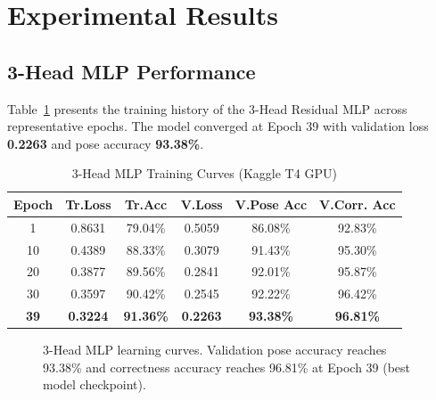 \documentclass[conference]{IEEEtran}
\begin{document}
\section{Experimental Results}
\label{sec:experiments}

\subsection{3-Head MLP Performance}

Table~\ref{tab:mlpresult} presents the training history of the 3-Head Residual MLP
across representative epochs. The model converged at Epoch 39 with validation loss
\textbf{0.2263} and pose accuracy \textbf{93.38\%}.

\begin{table}[ht]
\centering
\caption{3-Head MLP Training Curves (Kaggle T4 GPU)}
\label{tab:mlpresult}
\begin{tabular}{@{}c|cccc|c@{}}
\toprule
\textbf{Epoch} & \textbf{Tr.Loss} & \textbf{Tr.Acc} & \textbf{V.Loss} &
\textbf{V.Pose Acc} & \textbf{V.Corr. Acc} \\
\midrule
1  & 0.8631 & 79.04\% & 0.5059 & 86.08\% & 92.83\% \\
10 & 0.4389 & 88.33\% & 0.3079 & 91.43\% & 95.30\% \\
20 & 0.3877 & 89.56\% & 0.2841 & 92.01\% & 95.87\% \\
30 & 0.3597 & 90.42\% & 0.2545 & 92.22\% & 96.42\% \\
\textbf{39} & \textbf{0.3224} & \textbf{91.36\%} & \textbf{0.2263} &
\textbf{93.38\%} & \textbf{96.81\%} \\
\bottomrule
\end{tabular}
\end{table}

\begin{figure}[ht]
\centering
{}
\caption{3-Head MLP learning curves. Validation pose accuracy reaches 93.38\% and
correctness accuracy reaches 96.81\% at Epoch 39 (best model checkpoint).}
\label{fig:mlpcurves}
\end{figure}
\end{document}
